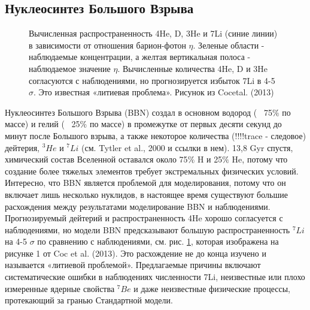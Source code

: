 \documentclass[%
bachelor,    %
natbib,      %
subf,        %
href,        %
colorlinks,  %
]{disser}
\begin{document}
\subsection{Нуклеосинтез Большого Взрыва}
\begin{figure}[h]
	\caption{Вычисленная распространенность 4He, D, 3He и 7Li (синие линии) в зависимости от отношения барион-фотон $\eta$. Зеленые области - наблюдаемые концентрации, а желтая вертикальная полоса - наблюдаемое значение $\eta$. Вычисленные количества 4He, D и 3He согласуются с наблюдениями, но прогнозируется избыток 7Li в 4-5 $\sigma$. Это известная «литиевая проблема». Рисунок из Cocetal. (2013) \cite{coctail}}
	\label{ris:2}
\end{figure}

Нуклеосинтез Большого Взрыва (BBN) создал в основном водород (~ 75$\%$ по массе) и гелий (~ 25$\%$ по массе) в промежутке от первых десяти секунд до минут после Большого взрыва, а также некоторое количества (!!!!trace - следовое) дейтерия, $^3He$ и $^7Li$ (см. Tytler et al., 2000 и ссылки в нем). 13,8 Gyr спустя, химический состав Вселенной оставался около 75$\%$ H и 25$\%$ He, потому что создание более тяжелых элементов требует экстремальных физических условий. Интересно, что BBN является проблемой для моделирования, потому что он включает лишь несколько нуклидов, в настоящее время существуют большие расхождения между результатами моделирование BBN и наблюдениями. Прогнозируемый дейтерий и распространенность 4He хорошо согласуется с наблюдениями, но модели BBN предсказывают большую распространенность $^{7}Li$ на 4-5 $\sigma$ по сравнению с наблюдениями, см. рис. \ref{ris:2}, которая изображена на рисунке 1 от Coc et al. (2013). Это расхождение не до конца изучено и называется «литиевой проблемой». Предлагаемые причины включают систематические ошибки в наблюдениях численности 7Li, неизвестные или плохо измеренные ядерные свойства $^{7}Be$ и даже неизвестные физические процессы, протекающий за гранью Стандартной модели.
\end{document}
